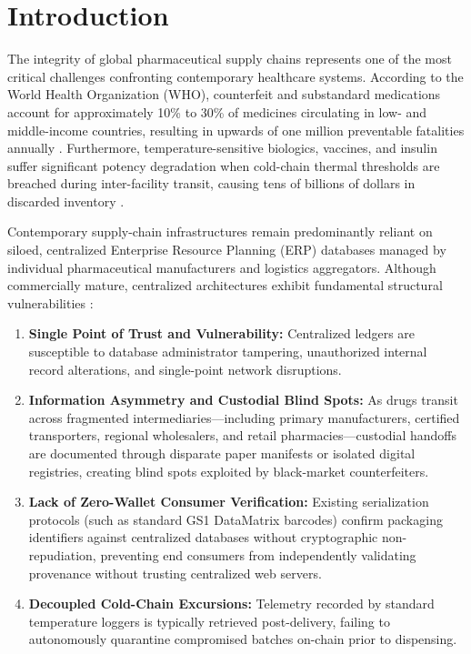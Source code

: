 \documentclass[pdflatex,sn-mathphys-num]{sn-jnl}
\theoremstyle{thmstyleone}
\theoremstyle{thmstyletwo}
\theoremstyle{thmstylethree}
\begin{document}

\maketitle

\section{Introduction}\label{sec1}

The integrity of global pharmaceutical supply chains represents one of the most critical challenges confronting contemporary healthcare systems. According to the World Health Organization (WHO), counterfeit and substandard medications account for approximately 10\% to 30\% of medicines circulating in low- and middle-income countries, resulting in upwards of one million preventable fatalities annually \cite{who2020counterfeit,mackey2020blockchain}. Furthermore, temperature-sensitive biologics, vaccines, and insulin suffer significant potency degradation when cold-chain thermal thresholds are breached during inter-facility transit, causing tens of billions of dollars in discarded inventory \cite{tsang2018iot}.

Contemporary supply-chain infrastructures remain predominantly reliant on siloed, centralized Enterprise Resource Planning (ERP) databases managed by individual pharmaceutical manufacturers and logistics aggregators. Although commercially mature, centralized architectures exhibit fundamental structural vulnerabilities \cite{clauson2018leveraging}:
\begin{enumerate}
    \item \textbf{Single Point of Trust and Vulnerability:} Centralized ledgers are susceptible to database administrator tampering, unauthorized internal record alterations, and single-point network disruptions.
    \item \textbf{Information Asymmetry and Custodial Blind Spots:} As drugs transit across fragmented intermediaries---including primary manufacturers, certified transporters, regional wholesalers, and retail pharmacies---custodial handoffs are documented through disparate paper manifests or isolated digital registries, creating blind spots exploited by black-market counterfeiters.
    \item \textbf{Lack of Zero-Wallet Consumer Verification:} Existing serialization protocols (such as standard GS1 DataMatrix barcodes) confirm packaging identifiers against centralized databases without cryptographic non-repudiation, preventing end consumers from independently validating provenance without trusting centralized web servers.
    \item \textbf{Decoupled Cold-Chain Excursions:} Telemetry recorded by standard temperature loggers is typically retrieved post-delivery, failing to autonomously quarantine compromised batches on-chain prior to dispensing.
\end{enumerate}
\end{document}
